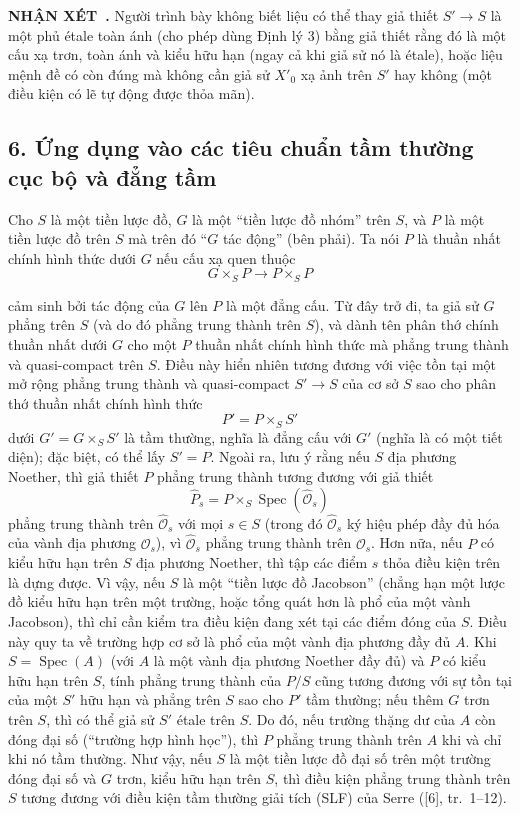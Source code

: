 \documentclass[11pt,twoside,openany]{book}
\numberwithin{equation}{section}
\newcommand{\src}[1]{%
  \phantomsection\hypertarget{src:\fgasourceid:#1}{}%
  \marginpar{\raggedleft\footnotesize\sffamily #1}%
}
\newcommand{\fgasourceid}{unset}
\newcommand{\result}[2]{\par\medskip\noindent\textbf{#1\if\relax\detokenize{#2}\relax\else\ #2\fi.}\quad}
\begin{document}
\result{NHẬN XÉT}{} Người trình bày không biết liệu có thể thay giả thiết
$S'\longrightarrow S$ là một phủ étale toàn ánh (cho phép dùng Định lý 3) bằng
giả thiết rằng đó là một cấu xạ trơn, toàn ánh và kiểu hữu hạn (ngay cả khi giả
sử nó là étale), hoặc liệu mệnh đề có còn đúng mà không cần giả sử $X'_0$ xạ
ảnh trên $S'$ hay không (một điều kiện có lẽ tự động được thỏa mãn).

\subsection*{6. Ứng dụng vào các tiêu chuẩn tầm thường cục bộ và đẳng tầm}

Cho $S$ là một tiền lược đồ, $G$ là một ``tiền lược đồ nhóm'' trên $S$, và $P$
là một tiền lược đồ trên $S$ mà trên đó ``$G$ tác động'' (bên phải). Ta nói
$P$ là thuần nhất chính hình thức dưới $G$ nếu cấu xạ quen thuộc
\[
  G\times_SP\longrightarrow P\times_SP
\]

\src{325}
cảm sinh bởi tác động của $G$ lên $P$ là một đẳng cấu. Từ đây trở đi, ta giả
sử $G$ phẳng trên $S$ (và do đó phẳng trung thành trên $S$), và dành tên
phân thớ chính thuần nhất dưới $G$ cho một $P$ thuần nhất chính hình thức
mà phẳng trung thành và quasi-compact trên $S$. Điều này hiển nhiên tương đương
với việc tồn tại một mở rộng phẳng trung thành và quasi-compact
$S'\longrightarrow S$ của cơ sở $S$ sao cho phân thớ thuần nhất chính hình thức
\[
  P'=P\times_SS'
\]
dưới $G'=G\times_SS'$ là tầm thường, nghĩa là đẳng cấu với $G'$ (nghĩa là có
một tiết diện); đặc biệt, có thể lấy $S'=P$. Ngoài ra, lưu ý rằng nếu $S$ địa
phương Noether, thì giả thiết $P$ phẳng trung thành tương đương với
giả thiết
\[
  \widehat P_s=P\times_S\operatorname{Spec}(\widehat{\mathcal O}_s)
\]
phẳng trung thành trên $\widehat{\mathcal O}_s$ với mọi $s\in S$ (trong đó
$\widehat{\mathcal O}_s$ ký hiệu phép đầy đủ hóa của vành địa phương
$\mathcal O_s$), vì $\widehat{\mathcal O}_s$ phẳng trung thành trên
$\mathcal O_s$. Hơn nữa, nếu $P$ có kiểu hữu hạn trên $S$ địa phương Noether,
thì tập các điểm $s$ thỏa điều kiện trên là dựng được. Vì vậy, nếu $S$ là một
``tiền lược đồ Jacobson'' (chẳng hạn một lược đồ kiểu hữu hạn trên một trường,
hoặc tổng quát hơn là phổ của một vành Jacobson), thì chỉ cần kiểm tra điều kiện
đang xét tại các điểm đóng của $S$. Điều này quy ta về trường hợp cơ sở là phổ
của một vành địa phương đầy đủ $A$. Khi $S=\operatorname{Spec}(A)$ (với $A$ là
một vành địa phương Noether đầy đủ) và $P$ có kiểu hữu hạn trên $S$, tính phẳng
trung thành của $P/S$ cũng tương đương với sự tồn tại của một $S'$ hữu hạn và
phẳng trên $S$ sao cho $P'$ tầm thường; nếu thêm $G$ trơn trên $S$, thì có thể
giả sử $S'$ étale trên $S$. Do đó, nếu trường thặng dư của $A$ còn đóng đại số
(``trường hợp hình học''), thì $P$ phẳng trung thành trên $A$ khi và chỉ khi nó
tầm thường. Như vậy, nếu $S$ là một tiền lược đồ đại số trên một trường đóng
đại số và $G$ trơn, kiểu hữu hạn trên $S$, thì điều kiện phẳng trung thành trên
$S$ tương đương với điều kiện tầm thường giải tích (SLF) của Serre ([6],
tr.~1--12).
\end{document}
